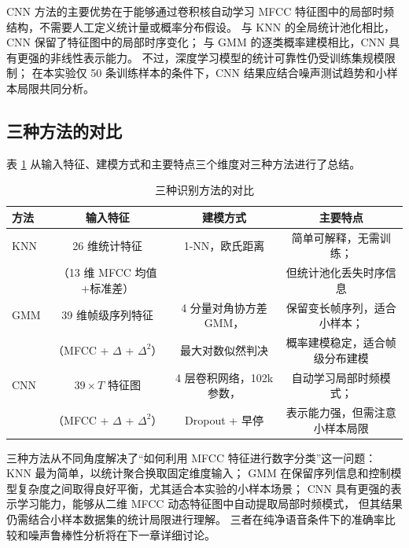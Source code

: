 CNN 方法的主要优势在于能够通过卷积核自动学习 MFCC 特征图中的局部时频结构，不需要人工定义统计量或概率分布假设。
与 KNN 的全局统计池化相比，CNN 保留了特征图中的局部时序变化；
与 GMM 的逐类概率建模相比，CNN 具有更强的非线性表示能力。
不过，深度学习模型的统计可靠性仍受训练集规模限制；
在本实验仅 50 条训练样本的条件下，CNN 结果应结合噪声测试趋势和小样本局限共同分析。

\subsection{三种方法的对比}

表 \ref{tab:method-compare} 从输入特征、建模方式和主要特点三个维度对三种方法进行了总结。

\begin{table}[H]
  \centering
  \caption{三种识别方法的对比}
  \label{tab:method-compare}
  \small
  \begin{tabular}{lccc}
    \toprule
    方法 & 输入特征 & 建模方式 & 主要特点 \\
    \midrule
    KNN & 26 维统计特征 & 1-NN，欧氏距离 &
    简单可解释，无需训练；\\
    &（13 维 MFCC 均值+标准差） & & 但统计池化丢失时序信息 \\
    \midrule
    GMM & 39 维帧级序列特征 &
    4 分量对角协方差 GMM， &
    保留变长帧序列，适合小样本；\\
    &（MFCC + $\Delta$ + $\Delta^2$） & 最大对数似然判决 &
    概率建模稳定，适合帧级分布建模 \\
    \midrule
    CNN & $39 \times T$ 特征图 &
    4 层卷积网络，102k 参数，&
    自动学习局部时频模式；\\
    &（MFCC + $\Delta$ + $\Delta^2$） & Dropout + 早停 &
    表示能力强，但需注意小样本局限 \\
    \bottomrule
  \end{tabular}
\end{table}

三种方法从不同角度解决了``如何利用 MFCC 特征进行数字分类''这一问题：
KNN 最为简单，以统计聚合换取固定维度输入；
GMM 在保留序列信息和控制模型复杂度之间取得良好平衡，尤其适合本实验的小样本场景；
CNN 具有更强的表示学习能力，能够从二维 MFCC 动态特征图中自动提取局部时频模式，
但其结果仍需结合小样本数据集的统计局限进行理解。
三者在纯净语音条件下的准确率比较和噪声鲁棒性分析将在下一章详细讨论。